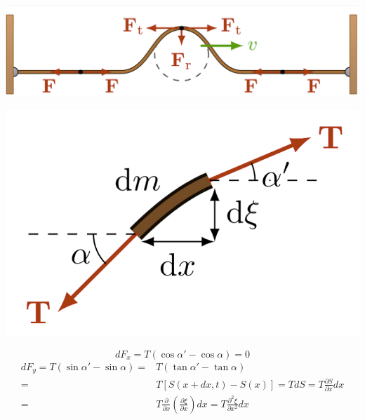 \documentclass[x11names]{report}
\begin{document}
	\vspace{0.2cm}
	\begin{minipage}{0.5\textwidth}
		\begin{center}
			\includegraphics[scale=0.2]{imgs/corda1.png}
		\end{center}
	\end{minipage}
	\begin{minipage}{0.5\textwidth}
		\begin{center}
			\includegraphics[scale=0.2]{imgs/corda2.png}
		\end{center}
	\end{minipage}
	\vspace{0.2cm}
	
	
	\[ 
	dF_x = T(\cos\alpha' - \cos\alpha ) = 0 
	\]
	\begin{align*}
		dF_y = T(\sin\alpha' - \sin\alpha ) =& T(\tan\alpha' - \tan\alpha )\\
		=& T\left[S(x+dx,t) - S(x)\right] = TdS = T\frac{\partial S}{\partial x}dx \\
		=& T\frac{\partial}{\partial x}\left(\frac{\partial \xi}{\partial x}\right)dx =  T\frac{\partial^2 \xi}{\partial x^2}dx\\
	\end{align*}
	
\end{document}
